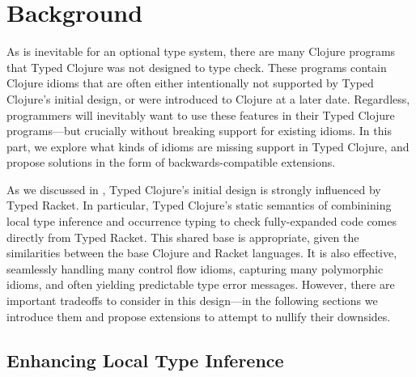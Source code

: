 \chapter{Background}

As is inevitable for an optional type system, there are many
Clojure programs that Typed Clojure was not designed to type check.
These programs contain Clojure idioms that are often either intentionally
not supported by Typed Clojure's initial design, or 
were introduced to Clojure at a later date.
Regardless, programmers will inevitably want to use these features 
in their Typed Clojure programs---but crucially without breaking
support for existing idioms.
In this part, we explore what kinds of idioms are missing
support in Typed Clojure, and propose solutions in the form of
backwards-compatible extensions.

As we discussed in , Typed Clojure's initial
design is strongly influenced by Typed Racket. In particular,
Typed Clojure's static semantics of
combinining local type inference and occurrence typing
to check fully-expanded code
comes directly from Typed Racket.
This shared base is appropriate, given the similarities between
the base Clojure and Racket languages.
It is also effective, seamlessly handling many control flow
idioms, capturing many polymorphic idioms, and often yielding
predictable type error messages.
However, there are important tradeoffs to consider in this design---in the following
sections we introduce them and propose extensions to attempt to nullify
their downsides.

\section{Enhancing Local Type Inference}

